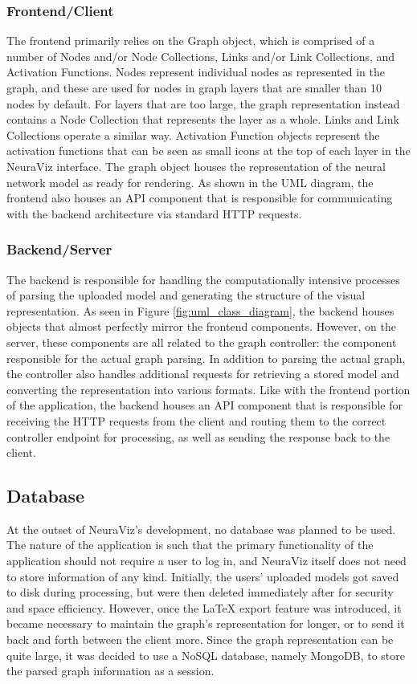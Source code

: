 \subsubsection{Frontend/Client}
The frontend primarily relies on the Graph object, which is comprised of a number of Nodes and/or Node Collections, Links and/or Link Collections, and Activation Functions. Nodes represent individual nodes as represented in the graph, and these are used for nodes in graph layers that are smaller than 10 nodes by default. For layers that are too large, the graph representation instead contains a Node Collection that represents the layer as a whole. Links and Link Collections operate a similar way. Activation Function objects represent the activation functions that can be seen as small icons at the top of each layer in the NeuraViz interface. The graph object houses the representation of the neural network model as ready for rendering. As shown in the UML diagram, the frontend also houses an API component that is responsible for communicating with the backend architecture via standard HTTP requests.

\subsubsection{Backend/Server}
The backend is responsible for handling the computationally intensive processes of parsing the uploaded model and generating the structure of the visual representation. As seen in Figure \ref{fig:uml_class_diagram}, the backend houses objects that almost perfectly mirror the frontend components. However, on the server, these components are all related to the graph controller: the component responsible for the actual graph parsing. In addition to parsing the actual graph, the controller also handles additional requests for retrieving a stored model and converting the representation into various formats. Like with the frontend portion of the application, the backend houses an API component that is responsible for receiving the HTTP requests from the client and routing them to the correct controller endpoint for processing, as well as sending the response back to the client.

\subsection{Database}
At the outset of NeuraViz's development, no database was planned to be used. The nature of the application is such that the primary functionality of the application should not require a user to log in, and NeuraViz itself does not need to store information of any kind. Initially, the users' uploaded models got saved to disk during processing, but were then deleted immediately after for security and space efficiency. However, once the \LaTeX{} export feature was introduced, it became necessary to maintain the graph's representation for longer, or to send it back and forth between the client more. Since the graph representation can be quite large, it was decided to use a NoSQL database, namely MongoDB, to store the parsed graph information as a session.

